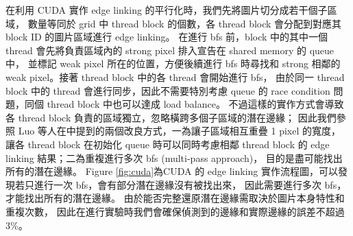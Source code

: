 \documentclass[sigconf,nonacm]{acmart}
\begin{document}
在利用 CUDA 實作 edge linking 的平行化時，我們先將圖片切分成若干個子區域，
數量等同於 grid 中 thread block 的個數，各 thread block 會分配到對應其 block ID 的圖片區域進行 edge linking。
在進行 bfs 前，block 中的其中一個 thread 會先將負責區域內的 strong pixel 排入宣告在 shared memory 的 queue 中，
並標記 weak pixel 所在的位置，方便後續進行 bfs 時尋找和 strong 相鄰的 weak pixel。接著 thread block 中的各 thread 會開始進行 bfs，
由於同一 thread block 中的 thread 會進行同步，因此不需要特別考慮 queue 的 race condition 問題，同個 thread block 中也可以達成 load balance。
不過這樣的實作方式會導致各 thread block 負責的區域獨立，忽略橫跨多個子區域的潛在邊緣；
因此我們參照 Luo 等人在\cite{4563088}中提到的兩個改良方式，一為讓子區域相互重疊 1 pixel 的寬度，
讓各 thread block 在初始化 queue 時可以同時考慮相鄰 thread block 的 edge linking 結果；二為重複進行多次 bfs (multi-pass approach)，
目的是盡可能找出所有的潛在邊緣。
Figure \ref{fig:cuda}為CUDA 的 edge linking 實作流程圖，可以發現若只進行一次 bfs，會有部分潛在邊緣沒有被找出來，
因此需要進行多次 bfs，才能找出所有的潛在邊緣。
由於能否完整還原潛在邊緣需取決於圖片本身特性和重複次數，
因此在進行實驗時我們會確保偵測到的邊緣和實際邊緣的誤差不超過3\%。
\end{document}
